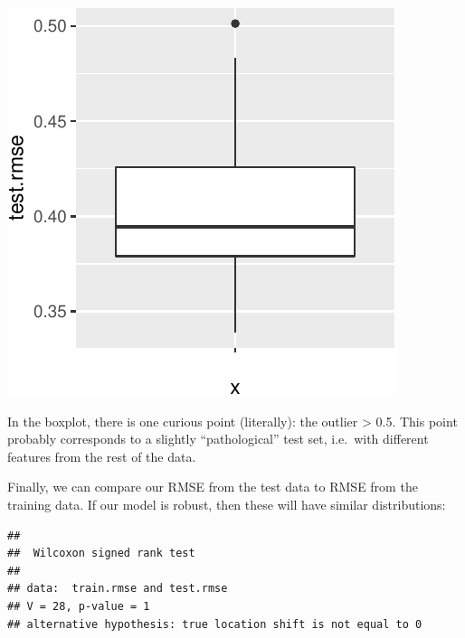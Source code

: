\documentclass[]{article}
\newenvironment{Shaded}{\begin{snugshade}}{\end{snugshade}}
\newcommand{\KeywordTok}[1]{\textcolor[rgb]{0.13,0.29,0.53}{\textbf{#1}}}
\newcommand{\DataTypeTok}[1]{\textcolor[rgb]{0.13,0.29,0.53}{#1}}
\newcommand{\StringTok}[1]{\textcolor[rgb]{0.31,0.60,0.02}{#1}}
\newcommand{\OperatorTok}[1]{\textcolor[rgb]{0.81,0.36,0.00}{\textbf{#1}}}
\newcommand{\NormalTok}[1]{#1}
\begin{document}
\begin{center}\includegraphics{kfold_supplement_files/figure-latex/unnamed-chunk-10-1} \end{center}

In the boxplot, there is one curious point (literally): the outlier
\textgreater{} 0.5. This point probably corresponds to a slightly
``pathological'' test set, i.e.~with different features from the rest of
the data.

Finally, we can compare our RMSE from the test data to RMSE from the
training data. If our model is robust, then these will have similar
distributions:

\begin{Shaded}
\end{Shaded}

\begin{verbatim}
## 
##  Wilcoxon signed rank test
## 
## data:  train.rmse and test.rmse
## V = 28, p-value = 1
## alternative hypothesis: true location shift is not equal to 0
\end{verbatim}
\end{document}
